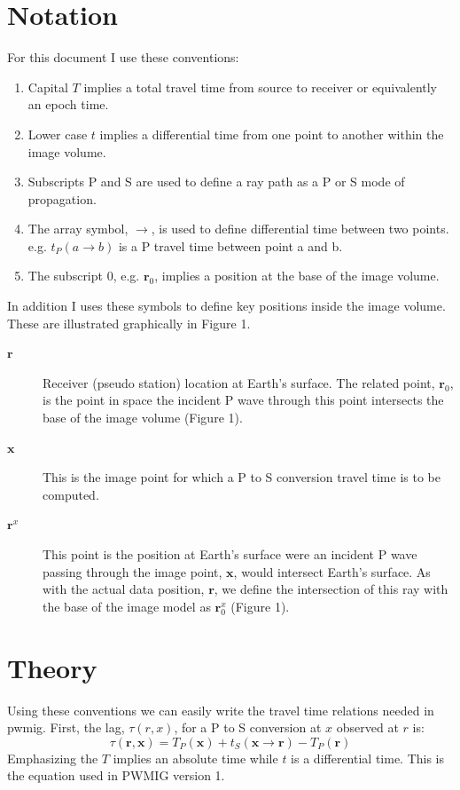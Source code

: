 \documentclass[12pt]{amsart}
\begin{document}
\section{Notation}
For this document I use these conventions:
\begin{enumerate}
\item Capital $T$ implies a total travel time from source to receiver or equivalently an epoch time.
\item Lower case $t$ implies a differential time from one point to another within the image volume. 
\item Subscripts P and S are used to define a ray path as a P or S mode of propagation.   
\item The array symbol, $\rightarrow$, is used to define differential time between two points.  
e.g. $t_P ( a \rightarrow b )$ is a P travel time between point a and b.
\item The subscript 0, e.g. $\mathbf{r}_0$, implies a position at the base of the image volume.  
\end{enumerate}
In addition I uses these symbols to define key positions inside the image volume.  These are illustrated graphically in Figure 1.
\begin{description}
\item[ $\mathbf{r}$ ] 
Receiver (pseudo station) location at Earth's surface.  The related point, $\mathbf{r}_0$, is the point in space the incident P wave through this point intersects the base of the image volume (Figure 1).
\item[$\mathbf{x}$] 
This is the image point for which a P to S conversion travel time is to be computed.
\item[$\mathbf{r}^x$] This point is the position at Earth's surface were an incident P wave passing through the image point, $\mathbf{x}$, would intersect Earth's surface.  As with the actual data position, $\mathbf{r}$, we define the intersection of this ray with the base of the image model as $\mathbf{r}_0^x$ (Figure 1).

\end{description}
\section{Theory}
Using these conventions we can easily write the travel time relations needed in pwmig.  
First, the lag, $\tau (r,x) $, for a P to S conversion at $x$ observed at $r$ is:
\begin{equation}
\tau ( \mathbf{r},\mathbf{x}) = T_P(\mathbf{x}) + t_S(\mathbf{x} \rightarrow \mathbf{r}) - T_P (\mathbf{r})
\end{equation}
Emphasizing the $T$ implies an absolute time while $t$ is a differential time. 
This is the equation used in PWMIG version 1.  
\end{document}
